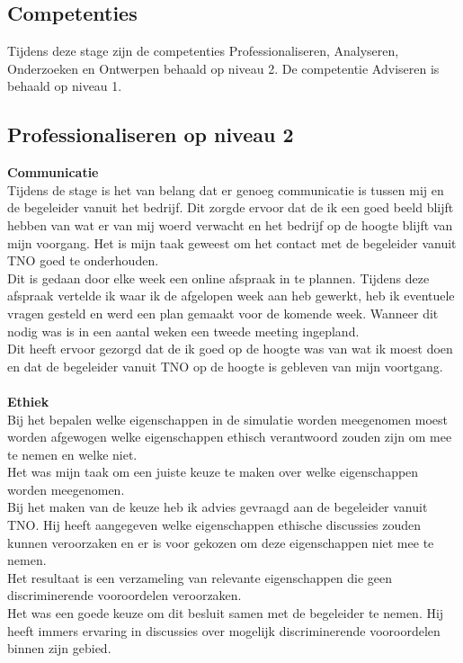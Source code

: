 \documentclass[12pt, letterpaper]{article}
\begin{document}
\begin{appendices}
\newpage
\section{Competenties} \label{competenties}
Tijdens deze stage zijn de competenties Professionaliseren, Analyseren, Onderzoeken en Ontwerpen behaald op niveau 2. De competentie Adviseren is behaald op niveau 1.
\subsection{Professionaliseren op niveau 2}
\textbf{Communicatie} \\
Tijdens de stage is het van belang dat er genoeg communicatie is tussen mij en de begeleider vanuit het bedrijf. Dit zorgde ervoor dat de ik een goed beeld blijft hebben van wat er van mij woerd verwacht en het bedrijf op de hoogte blijft van mijn voorgang.
Het is mijn taak geweest om het contact met de begeleider vanuit TNO goed te onderhouden. \\
Dit is gedaan door elke week een online afspraak in te plannen. Tijdens deze afspraak vertelde ik waar ik de afgelopen week aan heb gewerkt, heb ik eventuele vragen gesteld en werd een plan gemaakt voor de komende week. Wanneer dit nodig was is in een aantal weken een tweede meeting ingepland. \\
Dit heeft ervoor gezorgd dat de ik goed op de hoogte was van wat ik moest doen en dat de begeleider vanuit TNO op de hoogte is gebleven van mijn voortgang.\\
\\
\textbf{Ethiek} \\
Bij het bepalen welke eigenschappen in de simulatie worden meegenomen moest worden afgewogen welke eigenschappen ethisch verantwoord zouden zijn om mee te nemen en welke niet.\\
Het was mijn taak om een juiste keuze te maken over welke eigenschappen worden meegenomen.\\
Bij het maken van de keuze heb ik advies gevraagd aan de begeleider vanuit TNO. Hij heeft aangegeven welke eigenschappen ethische discussies zouden kunnen veroorzaken en er is voor gekozen om deze eigenschappen niet mee te nemen.\\
Het resultaat is een verzameling van relevante eigenschappen die geen discriminerende vooroordelen veroorzaken.\\
Het was een goede keuze om dit besluit samen met de begeleider te nemen. Hij heeft immers ervaring in discussies over mogelijk discriminerende vooroordelen binnen zijn gebied.\\

\end{appendices}
\end{document}
